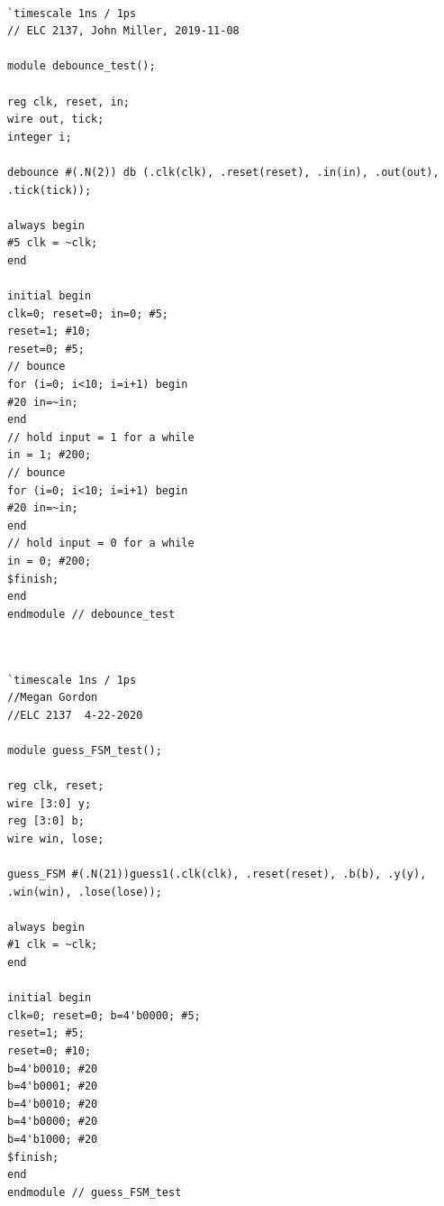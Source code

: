 \documentclass[11pt]{article}
\begin{document}
\begin{lstlisting}[style=Verilog,caption=debounce Test Bench Code,label=code:ex ]

`timescale 1ns / 1ps
// ELC 2137, John Miller, 2019-11-08 

module debounce_test();

reg clk, reset, in;
wire out, tick;
integer i;

debounce #(.N(2)) db (.clk(clk), .reset(reset), .in(in), .out(out),
.tick(tick));

always begin
#5 clk = ~clk;
end

initial begin
clk=0; reset=0; in=0; #5;
reset=1; #10;
reset=0; #5;
// bounce
for (i=0; i<10; i=i+1) begin
#20 in=~in;
end
// hold input = 1 for a while
in = 1; #200;
// bounce
for (i=0; i<10; i=i+1) begin
#20 in=~in;
end
// hold input = 0 for a while
in = 0; #200;
$finish;
end
endmodule // debounce_test


\end{lstlisting}
\clearpage

\begin{lstlisting}[style=Verilog,caption=guess FSM Test Bench Code,label=code:ex ]

`timescale 1ns / 1ps
//Megan Gordon
//ELC 2137  4-22-2020

module guess_FSM_test();

reg clk, reset;
wire [3:0] y;
reg [3:0] b;
wire win, lose;

guess_FSM #(.N(21))guess1(.clk(clk), .reset(reset), .b(b), .y(y), .win(win), .lose(lose));

always begin
#1 clk = ~clk;
end

initial begin
clk=0; reset=0; b=4'b0000; #5;
reset=1; #5;
reset=0; #10;
b=4'b0010; #20
b=4'b0001; #20
b=4'b0010; #20
b=4'b0000; #20
b=4'b1000; #20 
$finish;
end
endmodule // guess_FSM_test



\end{lstlisting}
\end{document}
